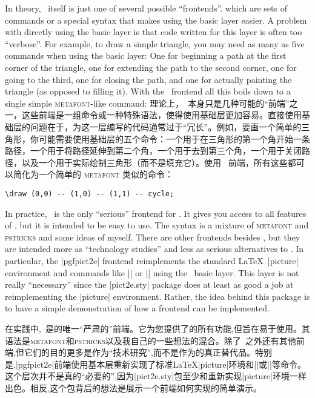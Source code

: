 \begin{paracol}{2}
In theory, \tikzname\ itself is just one of several possible ``frontends''.
which are sets of commands or a special syntax that makes using the basic layer
easier. A problem with directly using the basic layer is that code written for
this layer is often too ``verbose''. For example, to draw a simple triangle,
you may need as many as five commands when using the basic layer: One for
beginning a path at the first corner of the triangle, one for extending the
path to the second corner, one for going to the third, one for closing the
path, and one for actually painting the triangle (as opposed to filling it).
With the \tikzname\ frontend all this boils down to a single simple
\textsc{metafont}-like command:
\switchcolumn
理论上，\tikzname\ 本身只是几种可能的“前端”之一，这些前端是一组命令或一种特殊语法，使得使用基础层更加容易。直接使用基础层的问题在于，为这一层编写的代码通常过于“冗长”。例如，要画一个简单的三角形，你可能需要使用基础层的五个命令：一个用于在三角形的第一个角开始一条路径，一个用于将路径延伸到第二个角，一个用于去到第三个角，一个用于关闭路径，以及一个用于实际绘制三角形（而不是填充它）。使用 \tikzname\ 前端，所有这些都可以简化为一个简单的 \textsc{metafont} 类似的命令：
%
\begin{verbatim}
\draw (0,0) -- (1,0) -- (1,1) -- cycle;
\end{verbatim}

In practice, \tikzname\ is the only ``serious'' frontend for \pgfname. It gives
you access to all features of \pgfname, but it is intended to be easy to use.
The syntax is a mixture of \textsc{metafont} and \textsc{pstricks} and some
ideas of myself. There are other frontends besides \tikzname, but they are intended
more as ``technology studies'' and less as serious alternatives to
\tikzname. In particular, the |pgfpict2e| frontend   reimplements the standard
\LaTeX\ |{picture}|  environment and commands like |\line| or |\vector| using
the \pgfname\ basic layer. This layer is not really ``necessary'' since the
|pict2e.sty| package does at least as good a job at reimplementing the
|{picture}| environment. Rather, the idea behind this package is to have a
simple demonstration of how a frontend can be implemented.

在实践中,\tikzname\ 是\pgfname 的唯一“严肃的”前端。它为您提供了\pgfname 的所有功能,但旨在易于使用。其语法是\textsc{metafont}和\textsc{pstricks}以及我自己的一些想法的混合。除了\tikzname\ 之外还有其他前端,但它们的目的更多是作为“技术研究”,而不是作为\tikzname 的真正替代品。特别是,|pgfpict2e|前端使用\pgfname 基本层重新实现了标准\LaTeX|{picture}|环境和|\line|或|\vector|等命令。这个层次并不是真的“必要的”,因为|pict2e.sty|包至少和重新实现|{picture}|环境一样出色。相反,这个包背后的想法是展示一个前端如何实现的简单演示。


\end{paracol}
